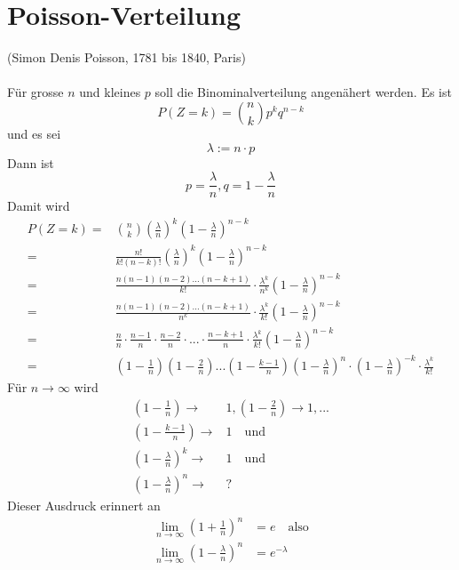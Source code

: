 \documentclass{report}
\begin{document}
\section{Poisson-Verteilung}
(Simon Denis Poisson, 1781 bis 1840, Paris)\\\\
Für grosse $n$ und kleines $p$ soll die Binominalverteilung angenähert werden. Es ist
\begin{equation}
P(Z=k) = \binom{n}{k} p^k q^{n-k}
\end{equation}
und es sei
\begin{equation}
\lambda := n \cdot p
\end{equation}
Dann ist
\begin{equation}
p = \frac{\lambda}{n}, q = 1 - \frac{\lambda}{n}
\end{equation}
Damit wird
\begin{align*}
P(Z=k) = & \binom{n}{k} \left(\frac{\lambda}{n}\right)^k \left(1 - \frac{\lambda}{n}\right)^{n-k}\\
= & \frac{n!}{k!(n-k)!} \left(\frac{\lambda}{n}\right)^k \left(1 - \frac{\lambda}{n}\right)^{n-k}\\
= & \frac{n (n-1)(n-2) ... (n-k+1)}{k!} \cdot \frac{\lambda^k}{n^k} \left(1 - \frac{\lambda}{n}\right)^{n-k}\\
= & \frac{n (n-1)(n-2) ... (n-k+1)}{n^k} \cdot \frac{\lambda^k}{k!} \left(1 - \frac{\lambda}{n}\right)^{n-k}\\
= & \frac{n}{n} \cdot \frac{n-1}{n} \cdot \frac{n-2}{n} \cdot ... \cdot \frac{n-k+1}{n} \cdot \frac{\lambda^k}{k!} \left(1 - \frac{\lambda}{n}\right)^{n-k}\\
= & (1- \frac{1}{n})(1- \frac{2}{n}) ... (1 - \frac{k-1}{n})\left(1- \frac{\lambda}{n}\right)^n \cdot \left(1- \frac{\lambda}{n}\right)^{-k} \cdot \frac{\lambda^k}{k!}
\end{align*}
Für $n \to \infty$ wird
\begin{align*}
\left(1-\frac{1}{n}\right) \longrightarrow & 1, \left(1-\frac{2}{n}\right) \longrightarrow 1, ...\\
\left(1- \frac{k-1}{n}\right) \longrightarrow & 1 \quad \mbox{und}\\
\left(1- \frac{\lambda}{n}\right)^k \longrightarrow & 1 \quad \mbox{und}\\
\left(1- \frac{\lambda}{n}\right)^n \longrightarrow & ?
\end{align*}
Dieser Ausdruck erinnert an
\begin{align*}
\lim_{n \to \infty}{\left(1 + \frac{1}{n}\right)^n} & =  e \quad \mbox{also}\\
\lim_{n \to \infty}{\left(1 - \frac{\lambda}{n}\right)^n} & = e^{-\lambda}
\end{align*}
\end{document}
